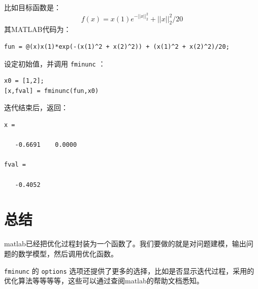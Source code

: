 \documentclass[10pt,a4paper,UTF8]{article}
\begin{document}
比如目标函数是：
\begin{equation}
\label{eq:5}
f(x) = x(1)e^{-||x||_{2}^{2}} + ||x||_{2}^{2}/20
\end{equation}
其MATLAB代码为：
\lstset{language=matlab,label= ,caption= ,captionpos=b,numbers=none}
\begin{lstlisting}
fun = @(x)x(1)*exp(-(x(1)^2 + x(2)^2)) + (x(1)^2 + x(2)^2)/20;
\end{lstlisting}
设定初始值，并调用 \texttt{fminunc} ：
\lstset{language=matlab,label= ,caption= ,captionpos=b,numbers=none}
\begin{lstlisting}
x0 = [1,2];
[x,fval] = fminunc(fun,x0)
\end{lstlisting}
迭代结束后，返回：
\begin{verbatim}
x =

   -0.6691    0.0000

fval =

   -0.4052
\end{verbatim}
\section{总结}
\label{sec:orge2d8efa}


matlab已经把优化过程封装为一个函数了。我们要做的就是对问题建模，输出问题的数学模型，然后调用优化函数。

\texttt{fminunc} 的 \texttt{options} 选项还提供了更多的选择，比如是否显示迭代过程，采用的优化算法等等等等，这些可以通过查阅matlab的帮助文档悉知。
\end{document}
